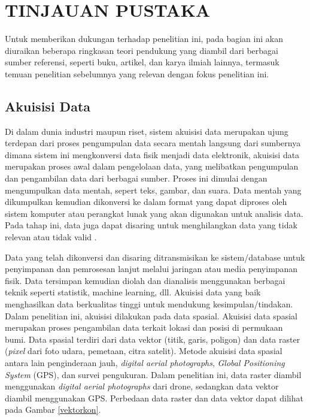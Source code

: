 \chapter{TINJAUAN PUSTAKA}
\par Untuk memberikan dukungan terhadap penelitian ini, pada bagian ini akan diuraikan beberapa ringkasan teori pendukung yang diambil dari berbagai sumber referensi, seperti buku, artikel, dan karya ilmiah lainnya, termasuk temuan penelitian sebelumnya yang relevan dengan fokus penelitian ini.

\section{Akuisisi Data}

Di dalam dunia industri maupun riset, sistem akuisisi data merupakan ujung terdepan dari proses
pengumpulan data secara mentah langsung dari sumbernya dimana sistem ini mengkonversi data
fisik menjadi data elektronik, akuisisi data merupakan proses awal dalam pengelolaan data, yang melibatkan pengumpulan dan pengambilan data dari berbagai sumber. Proses ini dimulai dengan mengumpulkan data mentah, sepert teks, gambar, dan suara. Data mentah yang dikumpulkan kemudian dikonversi ke dalam format yang dapat diproses oleh sistem komputer atau perangkat lunak yang akan digunakan untuk analisis data. Pada tahap ini, data juga dapat disaring untuk menghilangkan data yang tidak relevan atau tidak valid \citep{pratama2012akuisisi}. 

Data yang telah dikonversi dan disaring ditransmisikan ke sistem/database untuk penyimpanan dan pemrosesan lanjut melalui jaringan atau media penyimpanan fisik. Data tersimpan kemudian diolah dan dianalisis menggunakan berbagai teknik seperti statistik, machine learning, dll. Akuisisi data yang baik menghasilkan data berkualitas tinggi untuk mendukung kesimpulan/tindakan. Dalam penelitian ini, akuisisi dilakukan pada data spasial. Akuisisi data spasial merupakan proses pengambilan data terkait lokasi dan posisi di permukaan bumi. Data spasial terdiri dari data vektor (titik, garis, poligon) dan data raster (\textit{pixel} dari foto udara, pemetaan, citra satelit). Metode akuisisi data spasial antara lain penginderaan jauh, \textit{digital aerial photographs}, \textit{Global Positioning System} (GPS), dan survei pengukuran. Dalam penelitian ini, data raster diambil menggunakan \textit{digital aerial photographs} dari drone, sedangkan data vektor diambil menggunakan GPS. Perbedaan data raster dan data vektor dapat dilihat pada Gambar \ref{vektorkon}.

